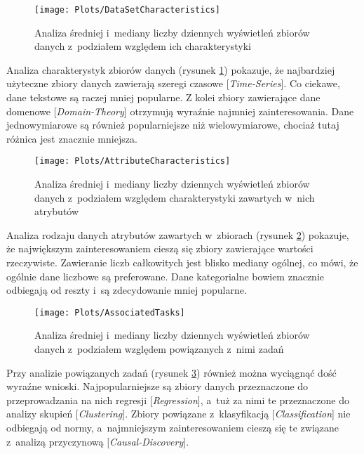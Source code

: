 \begin{figure}[ht]
      \texttt{[image: Plots/DataSetCharacteristics]}
      \caption{Analiza średniej i~mediany liczby dziennych wyświetleń zbiorów danych z~podziałem względem ich charakterystyki}
      \label{fig:datasetcharacteristics}
\end{figure}

Analiza charakterystyk zbiorów danych (rysunek \ref{fig:datasetcharacteristics}) pokazuje, że najbardziej użyteczne zbiory danych zawierają szeregi czasowe [\emph{Time-Series}].
Co ciekawe, dane tekstowe są raczej mniej popularne.
Z kolei zbiory zawierające dane domenowe [\emph{Domain-Theory}] otrzymują wyraźnie najmniej zainteresowania.
Dane jednowymiarowe są również popularniejsze niż wielowymiarowe, chociaż tutaj różnica jest znacznie mniejsza.

\begin{figure}[ht]
      \texttt{[image: Plots/AttributeCharacteristics]}
      \caption{Analiza średniej i~mediany liczby dziennych wyświetleń zbiorów danych z~podziałem względem charakterystyki zawartych w~nich atrybutów}
      \label{fig:attributecharacteristics}
\end{figure}

Analiza rodzaju danych atrybutów zawartych w~zbiorach (rysunek \ref{fig:attributecharacteristics}) pokazuje, że największym zainteresowaniem cieszą się zbiory zawierające wartości rzeczywiste.
Zawieranie liczb całkowitych jest blisko mediany ogólnej, co mówi, że ogólnie dane liczbowe są preferowane.
Dane kategorialne bowiem znacznie odbiegają od reszty i~są zdecydowanie mniej popularne.

\begin{figure}[ht]
      \texttt{[image: Plots/AssociatedTasks]}
      \caption{Analiza średniej i~mediany liczby dziennych wyświetleń zbiorów danych z~podziałem względem powiązanych z~nimi zadań}
      \label{fig:associatedtasks}
\end{figure}

Przy analizie powiązanych zadań (rysunek \ref{fig:associatedtasks}) również można wyciągnąć dość wyraźne wnioski.
Najpopularniejsze są zbiory danych przeznaczone do przeprowadzania na nich regresji [\emph{Regression}], a~tuż za nimi te przeznaczone do analizy skupień [\emph{Clustering}].
Zbiory powiązane z~klasyfikacją [\emph{Classification}] nie odbiegają od normy, a~najmniejszym zainteresowaniem cieszą się te związane z~analizą przyczynową [\emph{Causal-Discovery}].


